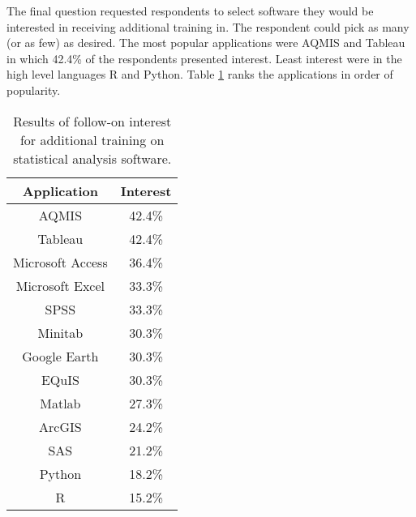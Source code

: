 \begin{table}[!htpb]
\centering
\caption{Results of training course evaluations.}
\label{tab:training2}
\end{table}

The final question requested respondents to select software they would be interested in receiving additional training in. The respondent could pick as many (or as few) as desired. The most popular applications were AQMIS and Tableau in which 42.4\% of the respondents presented interest. Least interest were in the high level languages R and Python. Table \ref{tab:interest} ranks the applications in order of popularity.

\begin{table}[!htpb]
\centering
\caption{Results of follow-on interest for additional training on statistical analysis software.}
\label{tab:interest}
\begin{tabular}{@{}cc@{}}
\toprule
\textbf{Application} & \textbf{Interest} \\ \midrule
AQMIS & 42.4\% \\
Tableau & 42.4\% \\
Microsoft Access & 36.4\% \\
Microsoft Excel & 33.3\% \\
SPSS & 33.3\% \\
Minitab & 30.3\% \\
Google Earth & 30.3\% \\
EQuIS & 30.3\% \\
Matlab & 27.3\% \\
ArcGIS & 24.2\% \\
SAS & 21.2\% \\
Python & 18.2\% \\
R & 15.2\% \\ \bottomrule
\end{tabular}
\end{table}

